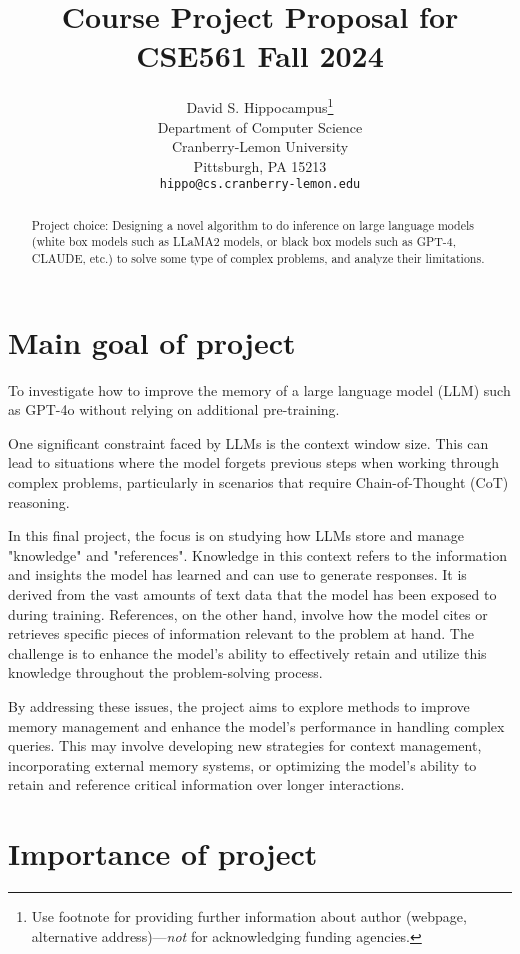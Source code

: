 \documentclass{article}
\title{Course Project Proposal for CSE561 Fall 2024}
\author{%
  David S. Hippocampus\thanks{Use footnote for providing further information
    about author (webpage, alternative address)---\emph{not} for acknowledging
    funding agencies.} \\
  Department of Computer Science\\
  Cranberry-Lemon University\\
  Pittsburgh, PA 15213 \\
  \texttt{hippo@cs.cranberry-lemon.edu} \\
}
\begin{document}
\maketitle


\begin{abstract}
Project choice: Designing a novel algorithm to do inference on large language models (white box models such as LLaMA2 models, or black box models such as GPT-4, CLAUDE, etc.) to solve some type of complex problems, and analyze their limitations.
\end{abstract}


\section{Main goal of project}

To investigate how to improve the memory of a large language model (LLM) such as GPT-4o without relying on additional pre-training.

One significant constraint faced by LLMs is the context window size. This can lead to situations where the model forgets previous steps when working through complex problems, particularly in scenarios that require Chain-of-Thought (CoT) reasoning\cite{Wei2022ChainOT}.

In this final project, the focus is on studying how LLMs store and manage "knowledge" and "references". Knowledge in this context refers to the information and insights the model has learned and can use to generate responses. It is derived from the vast amounts of text data that the model has been exposed to during training. References, on the other hand, involve how the model cites or retrieves specific pieces of information relevant to the problem at hand. The challenge is to enhance the model's ability to effectively retain and utilize this knowledge throughout the problem-solving process.

By addressing these issues, the project aims to explore methods to improve memory management and enhance the model's performance in handling complex queries. This may involve developing new strategies for context management, incorporating external memory systems, or optimizing the model's ability to retain and reference critical information over longer interactions.

\section{Importance of project}
\end{document}
